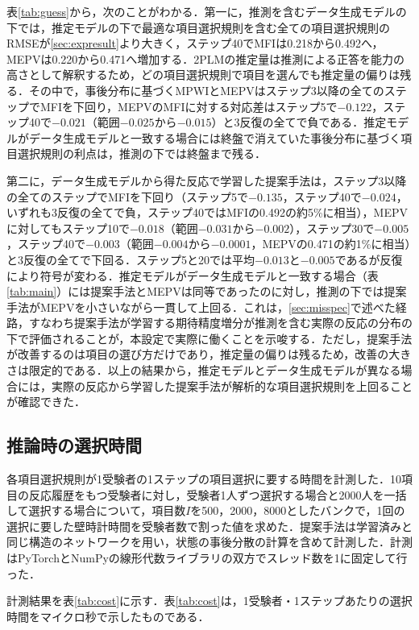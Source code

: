 \documentclass[a4paper,12pt,oneside,openany]{jsbook}
\begin{document}
表\ref{tab:guess}から，次のことがわかる．第一に，推測を含むデータ生成モデルの下では，推定モデルの下で最適な項目選択規則を含む全ての項目選択規則のRMSEが\ref{sec:expresult}より大きく，ステップ40でMFIは0.218から0.492へ，MEPVは0.220から0.471へ増加する．2PLMの推定量は推測による正答を能力の高さとして解釈するため，どの項目選択規則で項目を選んでも推定量の偏りは残る．その中で，事後分布に基づくMPWIとMEPVはステップ3以降の全てのステップでMFIを下回り，MEPVのMFIに対する対応差はステップ5で$-0.122$，ステップ40で$-0.021$（範囲$-0.025$から$-0.015$）と3反復の全てで負である．推定モデルがデータ生成モデルと一致する場合には終盤で消えていた事後分布に基づく項目選択規則の利点は，推測の下では終盤まで残る．

第二に，データ生成モデルから得た反応で学習した提案手法は，ステップ3以降の全てのステップでMFIを下回り（ステップ5で$-0.135$，ステップ40で$-0.024$，いずれも3反復の全てで負，ステップ40ではMFIの0.492の約5\%に相当），MEPVに対してもステップ10で$-0.018$（範囲$-0.031$から$-0.002$），ステップ30で$-0.005$，ステップ40で$-0.003$（範囲$-0.004$から$-0.0001$，MEPVの0.471の約1\%に相当）と3反復の全てで下回る．ステップ5と20では平均$-0.013$と$-0.005$であるが反復により符号が変わる．推定モデルがデータ生成モデルと一致する場合（表\ref{tab:main}）には提案手法とMEPVは同等であったのに対し，推測の下では提案手法がMEPVを小さいながら一貫して上回る．これは，\ref{sec:misspec}で述べた経路，すなわち提案手法が学習する期待精度増分が推測を含む実際の反応の分布の下で評価されることが，本設定で実際に働くことを示唆する．ただし，提案手法が改善するのは項目の選び方だけであり，推定量の偏りは残るため，改善の大きさは限定的である．以上の結果から，推定モデルとデータ生成モデルが異なる場合には，実際の反応から学習した提案手法が解析的な項目選択規則を上回ることが確認できた．

\subsection{推論時の選択時間}\label{sec:costexp}

各項目選択規則が1受験者の1ステップの項目選択に要する時間を計測した．10項目の反応履歴をもつ受験者に対し，受験者1人ずつ選択する場合と2000人を一括して選択する場合について，項目数$I$を500，2000，8000としたバンクで，1回の選択に要した壁時計時間を受験者数で割った値を求めた．提案手法は学習済みと同じ構造のネットワークを用い，状態の事後分散の計算を含めて計測した．計測はPyTorchとNumPyの線形代数ライブラリの双方でスレッド数を1に固定して行った．

計測結果を表\ref{tab:cost}に示す．表\ref{tab:cost}は，1受験者・1ステップあたりの選択時間をマイクロ秒で示したものである．
\end{document}
